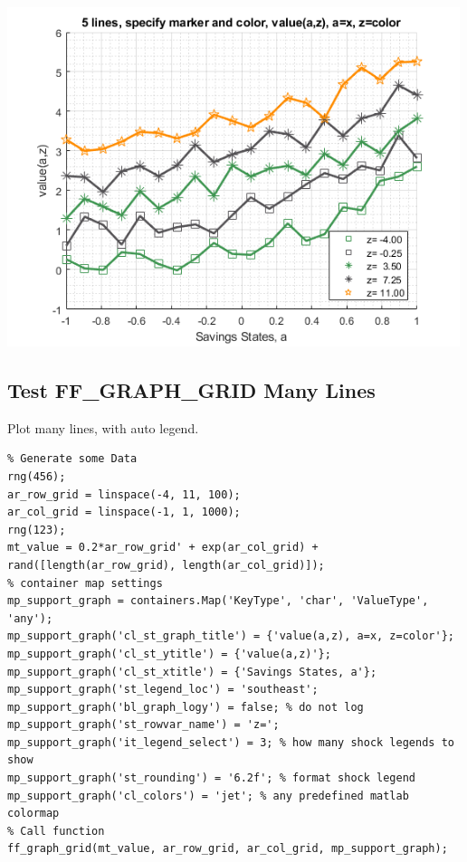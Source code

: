 \documentclass[
]{book}
\begin{document}
\includegraphics[width=5.20833in,height=\textheight]{img/fx_graph_grid_images/figure_5.png}

\hypertarget{test-ff_graph_grid-many-lines}{%
\subsection{Test FF\_GRAPH\_GRID Many Lines}\label{test-ff_graph_grid-many-lines}}

Plot many lines, with auto legend.

\begin{verbatim}
% Generate some Data
rng(456);
ar_row_grid = linspace(-4, 11, 100);
ar_col_grid = linspace(-1, 1, 1000);
rng(123);
mt_value = 0.2*ar_row_grid' + exp(ar_col_grid) + rand([length(ar_row_grid), length(ar_col_grid)]);
% container map settings
mp_support_graph = containers.Map('KeyType', 'char', 'ValueType', 'any');
mp_support_graph('cl_st_graph_title') = {'value(a,z), a=x, z=color'};
mp_support_graph('cl_st_ytitle') = {'value(a,z)'};
mp_support_graph('cl_st_xtitle') = {'Savings States, a'};
mp_support_graph('st_legend_loc') = 'southeast';
mp_support_graph('bl_graph_logy') = false; % do not log
mp_support_graph('st_rowvar_name') = 'z=';
mp_support_graph('it_legend_select') = 3; % how many shock legends to show
mp_support_graph('st_rounding') = '6.2f'; % format shock legend
mp_support_graph('cl_colors') = 'jet'; % any predefined matlab colormap
% Call function
ff_graph_grid(mt_value, ar_row_grid, ar_col_grid, mp_support_graph);
\end{verbatim}
\end{document}
